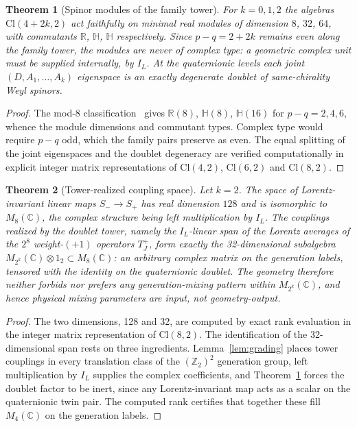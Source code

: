 \documentclass{birkjour}
\newtheorem{thm}{Theorem}[section]
\theoremstyle{definition}
\theoremstyle{remark}
\numberwithin{equation}{section}
\newcommand{\Cl}{\mathrm{Cl}}
\newcommand{\R}{\mathbb{R}}
\newcommand{\C}{\mathbb{C}}
\newcommand{\Z}{\mathbb{Z}}
\newenvironment{revblock}{}{}
\begin{document}
\begin{revblock}
\begin{thm}[Spinor modules of the family tower]
\label{thm:modules}
For $k=0,1,2$ the algebras $\Cl(4+2k,2)$ act faithfully on
minimal real modules of dimension $8$, $32$, $64$, with
commutants $\R$, $\mathbb{H}$, $\mathbb{H}$ respectively.
Since $p-q=2+2k$ remains even along the family tower, the
modules are never of complex type: a geometric complex unit
must be supplied internally, by $I_L$. At the quaternionic
levels each joint $(D,A_1,\ldots,A_k)$ eigenspace is an
exactly degenerate doublet of same-chirality Weyl spinors.
\end{thm}

\begin{proof}
The mod-8
classification~\cite{Lounesto2001,Porteous1995} gives
$\R(8)$, $\mathbb{H}(8)$, $\mathbb{H}(16)$ for
$p-q=2,4,6$, whence the module dimensions and commutant
types. Complex type would require $p-q$ odd, which the
family pairs preserve as even. The equal splitting of the
joint eigenspaces and the doublet degeneracy 
are verified computationally in explicit integer matrix
representations of $\Cl(4,2)$, $\Cl(6,2)$ and $\Cl(8,2)$.
\end{proof}

\begin{thm}[Tower-realized coupling space]\label{thm:coupling}
Let $k=2$. The space of Lorentz-invariant linear maps
$S_-\to S_+$ has real dimension $128$ and is isomorphic to
$M_8(\C)$, the complex structure being left multiplication
by $I_L$. The couplings realized by the doublet tower,
namely the $I_L$-linear span of the Lorentz averages of the
$2^8$ weight-$(+1)$ operators $T^+_J$, form exactly the
32-dimensional subalgebra
$M_{2^k}(\C)\otimes1_2\subset M_8(\C)$: an arbitrary
complex matrix on the generation labels, tensored with the
identity on the quaternionic doublet. The geometry
therefore neither forbids nor prefers any generation-mixing
pattern within $M_{2^k}(\C)$, and hence physical mixing 
parameters are input, not geometry-output.
\end{thm}

\begin{proof}
The two dimensions, 128 and 32, are computed by exact rank
evaluation in the integer matrix representation of
$\Cl(8,2)$. The identification of the 32-dimensional span
rests on three ingredients. Lemma~\ref{lem:grading} places
tower couplings in every translation class of the
$(\Z_2)^2$ generation group, left multiplication by $I_L$
supplies the complex coefficients, and
Theorem~\ref{thm:modules} forces the doublet factor to be
inert, since any Lorentz-invariant map acts as a scalar on
the quaternionic twin pair. The computed rank certifies
that together these fill $M_4(\C)$ on the generation
labels.
\end{proof}


\end{revblock}
\end{document}
